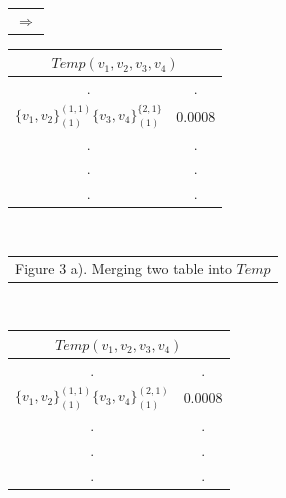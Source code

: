 \documentclass[12pt]{article}
\begin{document}
\begin{table}[!htb]
\begin{minipage}{.06\linewidth}
\begin{tabular}{c}
     $ \Rightarrow$\\
        \end{tabular}
    \end{minipage}%
     \begin{minipage}{.3\linewidth}
      \centering
     \begin{tabular}{cc}
\multicolumn{2}{c}{$Temp(v_1,v_2,v_3,v_4)$}                           \\ \hline
\multicolumn{1}{|c}{.} & \multicolumn{1}{|c|}{.} \\ \hline
  \multicolumn{1}{|l}{$\{v_1,v_2\}^{(1,1)}_{(1)}\{v_3,v_4\}^{\{2,1\}}_{(1)}$} & \multicolumn{1}{|l|}{$0.0008$} \\ \hline         
                   \multicolumn{1}{|c}{.} & \multicolumn{1}{|c|}{.} \\ \hline                 
                   \multicolumn{1}{|c}{.} & \multicolumn{1}{|c|}{.} \\ \hline
                   \multicolumn{1}{|c}{.} & \multicolumn{1}{|c|}{.} \\ \hline        
\end{tabular}
    \end{minipage}\\
    \begin{minipage}{1.0\linewidth}
       \centering
  
        \begin{tabular}{c}
Figure 3 a). Merging two table into $Temp$
        \end{tabular}
    \end{minipage}\\
     \begin{minipage}{.4\linewidth}
      \centering
     \begin{tabular}{cc}
\multicolumn{2}{c}{$Temp(v_1,v_2,v_3,v_4)$}                           \\ \hline
\multicolumn{1}{|c}{.} & \multicolumn{1}{|c|}{.} \\ \hline
  \multicolumn{1}{|l}{$\{v_1,v_2\}^{(1,1)}_{(1)}\{v_3,v_4\}^{(2,1)}_{(1)}$} & \multicolumn{1}{|l|}{$0.0008$} \\ \hline         
                   \multicolumn{1}{|c}{.} & \multicolumn{1}{|c|}{.} \\ \hline                 
                   \multicolumn{1}{|c}{.} & \multicolumn{1}{|c|}{.} \\ \hline
                   \multicolumn{1}{|c}{.} & \multicolumn{1}{|c|}{.} \\ \hline        
\end{tabular}
    \end{minipage}%
     \begin{minipage}{.06\linewidth}
   

\end{minipage}
\end{table}
\end{document}
